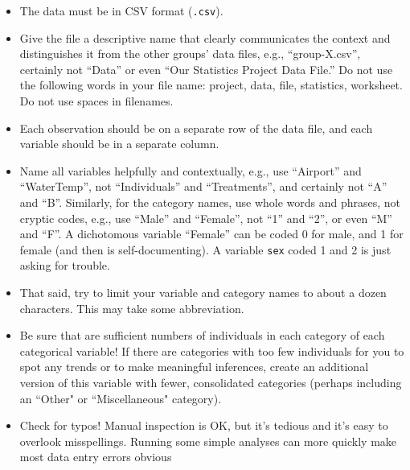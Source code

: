 \documentclass[10pt]{article}
\begin{document}
\begin{itemize}
	\item The data must be in CSV format (\texttt{.csv}).
	\item Give the file a descriptive name that clearly communicates the context and distinguishes it from the other groups' data files, e.g., “group-X.csv”, certainly not “Data” or even “Our Statistics Project Data File.”  Do not use the following words in your file name: project, data, file, statistics, worksheet. Do not use spaces in filenames.
	\item Each observation should be on a separate row of the data file, and each variable should be in a separate column.
	\item Name all variables helpfully and contextually, e.g., use “Airport” and “WaterTemp”, not “Individuals” and “Treatments”, and certainly not “A” and “B”.
Similarly, for the category names, use whole words and phrases, not cryptic codes, e.g., use “Male” and “Female”, not “1” and “2”, or even “M” and “F”.  A dichotomous variable “Female” can be coded 0 for male, and 1 for female (and then is self-documenting). A variable {\tt sex} coded 1 and 2 is just asking for trouble.
	\item That said, try to limit your variable and category names to about a dozen characters.  This may take some abbreviation.
	\item Be sure that are sufficient numbers of individuals in each category of each categorical variable!  If there are categories with too few individuals for you to spot any trends or to make meaningful inferences, create an additional version of this variable with fewer, consolidated categories (perhaps including an ``Other" or ``Miscellaneous" category).
	\item Check for typos!  Manual inspection is OK, but it’s tedious and it’s easy to overlook misspellings.  Running some simple analyses can more quickly make most data entry errors obvious
\end{itemize}
\end{document}
